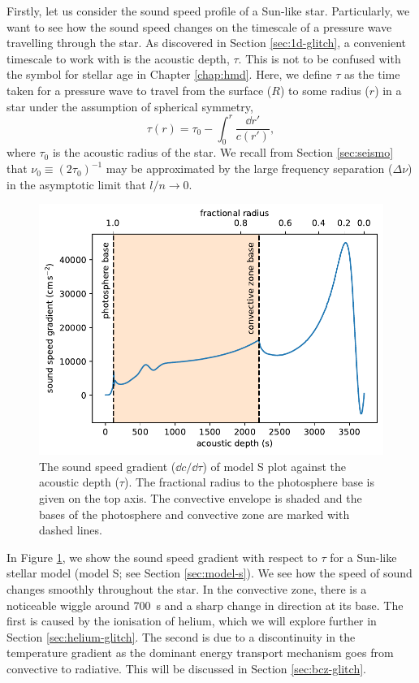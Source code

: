 Firstly, let us consider the sound speed profile of a Sun-like star. Particularly, we want to see how the sound speed changes on the timescale of a pressure wave travelling through the star. As discovered in Section \ref{sec:1d-glitch}, a convenient timescale to work with is the acoustic depth, \(\tau\). This is not to be confused with the symbol for stellar age in Chapter \ref{chap:hmd}. Here, we define \(\tau\) as the time taken for a pressure wave to travel from the surface (\(R\)) to some radius (\(r\)) in a star under the assumption of spherical symmetry,
%
\begin{equation}
    \tau(r) = \tau_0 - \int_0^{r} \frac{\dd r'}{c(r')},\label{eq:tau}
\end{equation}
%
where \(\tau_0\) is the acoustic radius of the star. We recall from Section \ref{sec:seismo} that \(\nu_0 \equiv (2\tau_0)^{-1}\) may be approximated by the large frequency separation (\(\Delta\nu\)) in the asymptotic limit that \(l/n \rightarrow 0\).

\begin{figure}[tb]
    \centering
    \includegraphics{figures/sound-speed-gradient.pdf}
    \caption[The sound speed gradient of model S plot against the acoustic depth.]{The sound speed gradient (\(\dd c/\dd \tau\)) of model S plot against the acoustic depth (\(\tau\)). The fractional radius to the photosphere base is given on the top axis. The convective envelope is shaded and the bases of the photosphere and convective zone are marked with dashed lines.}
    \label{fig:sound-speed-gradient}
\end{figure}

In Figure \ref{fig:sound-speed-gradient}, we show the sound speed gradient with respect to \(\tau\) for a Sun-like stellar model (model S; see Section \ref{sec:model-s}). We see how the speed of sound changes smoothly throughout the star. In the convective zone, there is a noticeable wiggle around \SI{700}{\second} and a sharp change in direction at its base. The first is caused by the ionisation of helium, which we will explore further in Section \ref{sec:helium-glitch}. The second is due to a discontinuity in the temperature gradient as the dominant energy transport mechanism goes from convective to radiative. This will be discussed in Section \ref{sec:bcz-glitch}.

